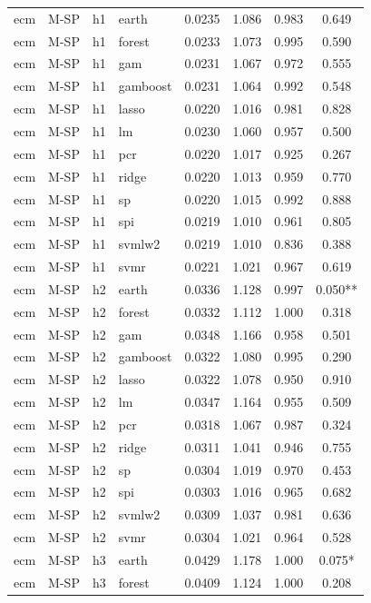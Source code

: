 \begin{ThreePartTable}
\begin{longtable}[t]{llclcccc}
\addlinespace
ecm & M-SP & h1 & earth & 0.0235 & 1.086 & 0.983 & 0.649\\
ecm & M-SP & h1 & forest & 0.0233 & 1.073 & 0.995 & 0.590\\
ecm & M-SP & h1 & gam & 0.0231 & 1.067 & 0.972 & 0.555\\
ecm & M-SP & h1 & gamboost & 0.0231 & 1.064 & 0.992 & 0.548\\
ecm & M-SP & h1 & lasso & 0.0220 & 1.016 & 0.981 & 0.828\\
ecm & M-SP & h1 & lm & 0.0230 & 1.060 & 0.957 & 0.500\\
ecm & M-SP & h1 & pcr & 0.0220 & 1.017 & 0.925 & 0.267\\
ecm & M-SP & h1 & ridge & 0.0220 & 1.013 & 0.959 & 0.770\\
ecm & M-SP & h1 & sp & 0.0220 & 1.015 & 0.992 & 0.888\\
ecm & M-SP & h1 & spi & 0.0219 & 1.010 & 0.961 & 0.805\\
ecm & M-SP & h1 & svmlw2 & 0.0219 & 1.010 & 0.836 & 0.388\\
ecm & M-SP & h1 & svmr & 0.0221 & 1.021 & 0.967 & 0.619\\
\addlinespace
ecm & M-SP & h2 & earth & 0.0336 & 1.128 & 0.997 & 0.050**\\
ecm & M-SP & h2 & forest & 0.0332 & 1.112 & 1.000 & 0.318\\
ecm & M-SP & h2 & gam & 0.0348 & 1.166 & 0.958 & 0.501\\
ecm & M-SP & h2 & gamboost & 0.0322 & 1.080 & 0.995 & 0.290\\
ecm & M-SP & h2 & lasso & 0.0322 & 1.078 & 0.950 & 0.910\\
ecm & M-SP & h2 & lm & 0.0347 & 1.164 & 0.955 & 0.509\\
ecm & M-SP & h2 & pcr & 0.0318 & 1.067 & 0.987 & 0.324\\
ecm & M-SP & h2 & ridge & 0.0311 & 1.041 & 0.946 & 0.755\\
ecm & M-SP & h2 & sp & 0.0304 & 1.019 & 0.970 & 0.453\\
ecm & M-SP & h2 & spi & 0.0303 & 1.016 & 0.965 & 0.682\\
ecm & M-SP & h2 & svmlw2 & 0.0309 & 1.037 & 0.981 & 0.636\\
ecm & M-SP & h2 & svmr & 0.0304 & 1.021 & 0.964 & 0.528\\
\addlinespace
ecm & M-SP & h3 & earth & 0.0429 & 1.178 & 1.000 & 0.075*\\
ecm & M-SP & h3 & forest & 0.0409 & 1.124 & 1.000 & 0.208\\

\end{longtable}
\end{ThreePartTable}
